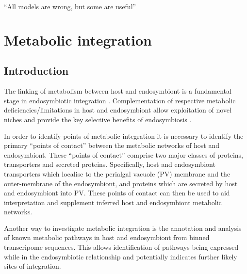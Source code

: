 \graphicspath{{chapters/5.Chapter_3/figures/}}

\begin{savequote}[75mm]
``All models are wrong, but some are useful''
\end{savequote}

\chapter{Metabolic integration}

\section{Introduction}

The linking of metabolism between host and endosymbiont is a fundamental 
stage in endosymbiotic integration \citep{Bhattacharya2007,Karkar2015a}.
Complementation of respective metabolic deficiencies/limitations in
host and endosymbiont allow exploitation of novel niches and provide
the key selective benefits of endosymbiosis \citep{Hoffmeister2003}.

In order to identify points of metabolic integration it is necessary to
identify the primary ``points of contact'' between the metabolic networks 
of host and endosymbiont. These ``points of contact'' comprise two
major classes of proteins, transporters and secreted proteins. 
Specifically, host and endosymbiont transporters which localise to the
perialgal vacuole (PV) membrane and the outer-membrane of the endosymbiont,
and proteins which are secreted by host and endosymbiont into 
PV.  These points of contact can then be used to aid interpretation
and supplement inferred host and endosymbiont metabolic networks. 

Another way to investigate metabolic integration is the annotation and analysis
of known metabolic pathways in host and endosymbiont from binned transcripome
sequences.  This allows identification of pathways being expressed while
in the endosymbiotic relationship and potentially indicates further likely
sites of integration.


